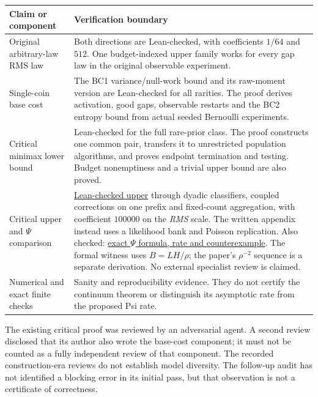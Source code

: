\documentclass[11pt]{article}
\begin{document}
\begin{center}
\begin{tabular}{>{\raggedright\arraybackslash}p{}>{\raggedright\arraybackslash}p{}}
\toprule
Claim or component & Verification boundary\\
\midrule
Original arbitrary-law RMS law & Both directions are Lean-checked,
with coefficients $1/64$ and $512$. One budget-indexed upper family
works for every gap law in the original observable experiment.\\[5pt]
Single-coin base cost & The BC1 variance/null-work bound and its raw-moment
version are Lean-checked for all rarities. The proof derives activation,
good gaps, observable restarts and the BC2 entropy bound from actual
seeded Bernoulli experiments.\\[5pt]
Critical minimax lower bound & Lean-checked for the full rare-prior class.
The proof constructs one common pair, transfers it to unrestricted
population algorithms, and proves endpoint termination and testing.
Budget nonemptiness and a trivial upper bound are also proved.\\[5pt]
Critical upper and $\Psi$ comparison &
\href{https://github.com/davidiach/adaptive-threshold-estimation/blob/eabf274cb42d4bff4daab6b58568ad6169e7f0a7/lean/ThresholdHC/CriticalUpper/Full.lean}{Lean-checked upper}
through dyadic classifiers, coupled corrections on one prefix and fixed-count
aggregation, with coefficient $100000$ on the \emph{RMS} scale. The written
appendix instead uses a likelihood bank and Poisson replication. Also checked:
\href{https://github.com/davidiach/adaptive-threshold-estimation/blob/eabf274cb42d4bff4daab6b58568ad6169e7f0a7/lean/ThresholdHC/CriticalPsi/Full.lean}{exact $\Psi$ formula, rate and counterexample}.
The formal witness uses $B=LH/\rho$; the paper's $\rho^{-2}$ sequence
is a separate derivation. No external specialist review is claimed.\\[5pt]
Numerical and exact finite checks & Sanity and reproducibility evidence.
They do not certify the continuum theorem or distinguish its asymptotic
rate from the proposed Psi rate.\\
\bottomrule
\end{tabular}
\end{center}

The existing critical proof was reviewed by an adversarial agent. A second
review disclosed that its author also wrote the base-cost component; it
must not be counted as a fully independent review of that component.
The recorded construction-era reviews do not establish model diversity. The follow-up audit has not identified
a blocking error in its initial pass, but that observation is not a
certificate of correctness.
\end{document}
